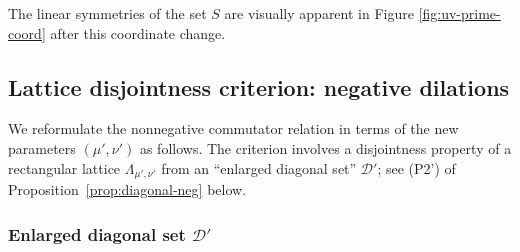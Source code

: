 \documentclass[11pt, letterpaper, reqno]{amsart}
\theoremstyle{definition}
\theoremstyle{remark}
\numberwithin{equation}{section}
\newcommand{\uu}{{\mu'}}
\newcommand{\vv}{{\nu'}}
\newcommand{\cDprime}{{\mathcal{D}'}}
\begin{document}
The linear  symmetries of the 
set $S$ are   visually  apparent in Figure \ref{fig:uv-prime-coord}
after this coordinate change. 


%
%
\subsection{Lattice disjointness criterion: negative dilations}
\label{sec:neg-disjointness1}

We reformulate the nonnegative  commutator relation  in terms of
the new parameters $(\uu,\vv)$ as follows.
The criterion involves a disjointness property 
of a rectangular lattice $\Lambda_{\uu,\vv}$
from an ``enlarged diagonal set'' $\cDprime$; 
see (P2') of Proposition~\ref{prop:diagonal-neg} below.


%
%
\subsubsection{Enlarged diagonal set $\cDprime$}
\label{subsubsec:approx-diag1}
\end{document}
